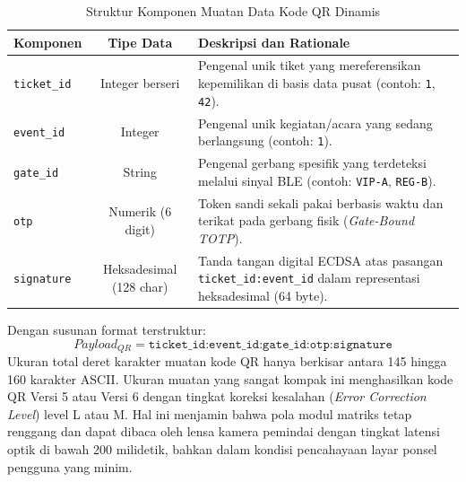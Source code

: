 \begin{table}[htbp]
    \caption{Struktur Komponen Muatan Data Kode QR Dinamis}
    \label{tab:payload_structure}
    \centering
    \begin{tabularx}{\textwidth}{ l c >{\raggedright\arraybackslash}X }
        \toprule
        \textbf{Komponen} & \textbf{Tipe Data} & \textbf{Deskripsi dan Rationale} \\
        \midrule
        \texttt{ticket\_id} & Integer berseri & Pengenal unik tiket yang mereferensikan kepemilikan di basis data pusat (contoh: \texttt{1}, \texttt{42}). \\
        \texttt{event\_id} & Integer & Pengenal unik kegiatan/acara yang sedang berlangsung (contoh: \texttt{1}). \\
        \texttt{gate\_id} & String & Pengenal gerbang spesifik yang terdeteksi melalui sinyal BLE (contoh: \texttt{VIP-A}, \texttt{REG-B}). \\
        \texttt{otp} & Numerik (6 digit) & Token sandi sekali pakai berbasis waktu dan terikat pada gerbang fisik (\textit{Gate-Bound TOTP}). \\
        \texttt{signature} & Heksadesimal (128 char) & Tanda tangan digital ECDSA atas pasangan \texttt{ticket\_id:event\_id} dalam representasi heksadesimal (64 byte). \\
        \bottomrule
    \end{tabularx}
\end{table}

Dengan susunan format terstruktur:
\begin{equation}
    Payload_{QR} = \texttt{ticket\_id:event\_id:gate\_id:otp:signature}
\end{equation}
Ukuran total deret karakter muatan kode QR hanya berkisar antara 145 hingga 160 karakter ASCII. Ukuran muatan yang sangat kompak ini menghasilkan kode QR Versi 5 atau Versi 6 dengan tingkat koreksi kesalahan (\textit{Error Correction Level}) level L atau M. Hal ini menjamin bahwa pola modul matriks tetap renggang dan dapat dibaca oleh lensa kamera pemindai dengan tingkat latensi optik di bawah 200 milidetik, bahkan dalam kondisi pencahayaan layar ponsel pengguna yang minim.

